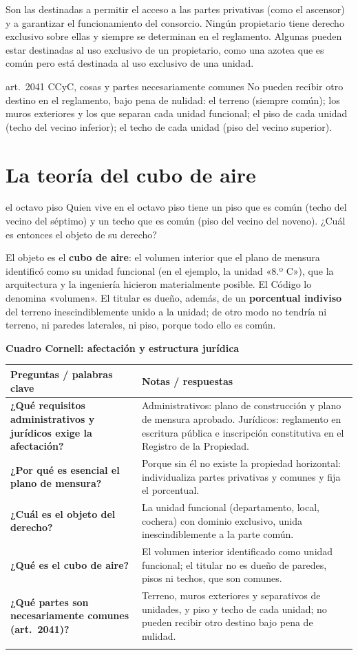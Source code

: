 \documentclass[12pt,oneside]{book}
\renewcommand{\arraystretch}{1.25}
\newcommand{\cq}[2]{\textbf{#1} & #2 \\[0.45em]}
\newcommand{\cornell}[3]{%
\par\bigskip\noindent\textbf{\large Cuadro Cornell: #1}\par\smallskip
\begin{center}
\small
\renewcommand{\arraystretch}{1.15}
\begin{tabularx}{\textwidth}{>{\raggedright\arraybackslash}p{0.27\textwidth}>{\raggedright\arraybackslash}X}
\toprule
\textbf{Preguntas / palabras clave} & \textbf{Notas / respuestas} \\
\midrule
#2
\midrule
\multicolumn{2}{p{\dimexpr\textwidth-2\tabcolsep\relax}}{\textbf{Resumen.} #3} \\
\bottomrule
\end{tabularx}
\end{center}
}
\begin{document}
Son las destinadas a permitir el acceso a las partes privativas (como el ascensor) y a garantizar el funcionamiento del consorcio. Ningún propietario tiene derecho exclusivo sobre ellas y siempre se determinan en el reglamento. Algunas pueden estar destinadas al uso exclusivo de un propietario, como una azotea que es común pero está destinada al uso exclusivo de una unidad.

\begin{regla}{art.~2041 CCyC, cosas y partes necesariamente comunes}
No pueden recibir otro destino en el reglamento, bajo pena de nulidad: el terreno (siempre común); los muros exteriores y los que separan cada unidad funcional; el piso de cada unidad (techo del vecino inferior); el techo de cada unidad (piso del vecino superior).
\end{regla}

\section{La teoría del cubo de aire}

\begin{ejemplo}{el octavo piso}
Quien vive en el octavo piso tiene un piso que es común (techo del vecino del séptimo) y un techo que es común (piso del vecino del noveno). ¿Cuál es entonces el objeto de su derecho?
\end{ejemplo}

El objeto es el \textbf{cubo de aire}: el volumen interior que el plano de mensura identificó como su unidad funcional (en el ejemplo, la unidad «8.º C»), que la arquitectura y la ingeniería hicieron materialmente posible. El Código lo denomina «volumen». El titular es dueño, además, de un \textbf{porcentual indiviso} del terreno inescindiblemente unido a la unidad; de otro modo no tendría ni terreno, ni paredes laterales, ni piso, porque todo ello es común. %

\cornell{afectación y estructura jurídica}{
\cq{¿Qué requisitos administrativos y jurídicos exige la afectación?}{Administrativos: plano de construcción y plano de mensura aprobado. Jurídicos: reglamento en escritura pública e inscripción constitutiva en el Registro de la Propiedad.}
\cq{¿Por qué es esencial el plano de mensura?}{Porque sin él no existe la propiedad horizontal: individualiza partes privativas y comunes y fija el porcentual.}
\cq{¿Cuál es el objeto del derecho?}{La unidad funcional (departamento, local, cochera) con dominio exclusivo, unida inescindiblemente a la parte común.}
\cq{¿Qué es el cubo de aire?}{El volumen interior identificado como unidad funcional; el titular no es dueño de paredes, pisos ni techos, que son comunes.}
\cq{¿Qué partes son necesariamente comunes (art.~2041)?}{Terreno, muros exteriores y separativos de unidades, y piso y techo de cada unidad; no pueden recibir otro destino bajo pena de nulidad.}
}{La afectación requiere plano de mensura aprobado y reglamento en escritura inscripto con efecto constitutivo. El objeto es la unidad funcional como cubo de aire con porcentual indiviso del terreno; terreno, muros, pisos y techos son necesariamente comunes.}
\end{document}

